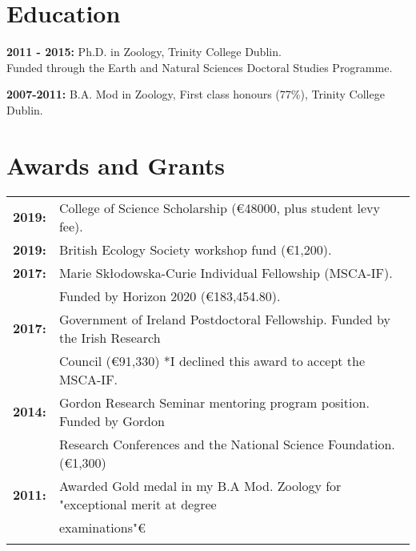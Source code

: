 \documentclass[10pt,a4paper]{article}
\begin{document}
\section{\textbf{Education}}

\raggedright	
\textbf{2011 - 2015:} Ph.D. in Zoology, Trinity College Dublin.\\
Funded through the Earth and Natural Sciences Doctoral Studies Programme.
\bigskip



\textbf{2007-2011:} B.A. Mod in Zoology, First class honours (77\%), Trinity College Dublin.\\

\bigskip

\bigskip




\section{\textbf{Awards and Grants}}


\begin{tabular}{ll}
\textbf{2019:} & College of Science Scholarship (\euro 48000, plus student levy fee).\\
\textbf{2019:} & British Ecology Society workshop fund (\euro 1,200).\\
\textbf{2017:} & Marie Sk\l{}odowska-Curie Individual Fellowship (MSCA-IF).\\ 
& Funded by Horizon 2020 (\euro 183,454.80).\\
\textbf{2017:} & Government of Ireland Postdoctoral Fellowship. Funded by the Irish Research\\
& Council (\euro 91,330) *I declined this award to accept the MSCA-IF.\\
\textbf{2014:} & Gordon Research Seminar mentoring program position. Funded by Gordon\\
& Research Conferences and the National Science Foundation. (\euro 1,300)\\
\textbf{2011:} & Awarded Gold medal in my B.A Mod. Zoology for "exceptional merit at degree\\ 
& examinations"€ 
\end{tabular}

\clearpage

\bigskip
\end{document}
